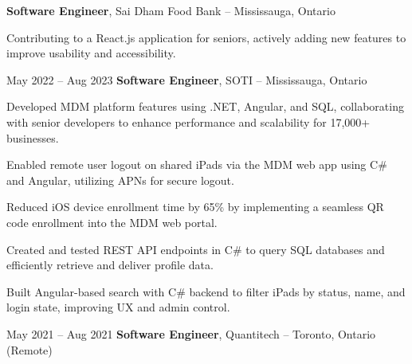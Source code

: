 \begin{twocolentry}{}
    \textbf{Software Engineer}, Sai Dham Food Bank – Mississauga, Ontario
\end{twocolentry}

\vspace{0.10 cm}
\begin{onecolentry}
\begin{highlights}
    \item Contributing to a React.js application for seniors, actively adding new features to improve usability and accessibility.
\end{highlights}
\end{onecolentry}

\vspace{0.27 cm} %

\begin{twocolentry}{May 2022 – Aug 2023}
    \textbf{Software Engineer}, SOTI – Mississauga, Ontario
\end{twocolentry}

\vspace{0.10 cm}
\begin{onecolentry}
\begin{highlights}
    \item Developed MDM platform features using .NET, Angular, and SQL, collaborating with senior developers to enhance performance and scalability for 17,000+ businesses.
    \item Enabled remote user logout on shared iPads via the MDM web app using C# and Angular, utilizing APNs for secure logout.
    \item Reduced iOS device enrollment time by 65\% by implementing a seamless QR code enrollment into the MDM web portal.
    \item Created and tested REST API endpoints in C\# to query SQL databases and efficiently retrieve and deliver profile data.
    \item Built Angular-based search with C\# backend to filter iPads by status, name, and login state, improving UX and admin control.
\end{highlights}
\end{onecolentry}

\vspace{0.27 cm} %

\begin{twocolentry}{May 2021 – Aug 2021}
    \textbf{Software Engineer}, Quantitech – Toronto, Ontario (Remote)
\end{twocolentry}

